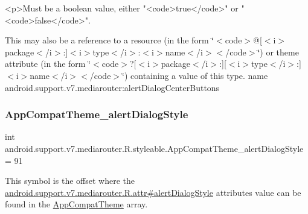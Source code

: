 \begin{DoxyVerb}      <p>Must be a boolean value, either "<code>true</code>" or "<code>false</code>".
\end{DoxyVerb}
 

This may also be a reference to a resource (in the form \char`\"{}$<$code$>$@\mbox{[}$<$i$>$package$<$/i$>$\+:\mbox{]}$<$i$>$type$<$/i$>$\+:$<$i$>$name$<$/i$>$$<$/code$>$\char`\"{}) or theme attribute (in the form \char`\"{}$<$code$>$?\mbox{[}$<$i$>$package$<$/i$>$\+:\mbox{]}\mbox{[}$<$i$>$type$<$/i$>$\+:\mbox{]}$<$i$>$name$<$/i$>$$<$/code$>$\char`\"{}) containing a value of this type.  name android.\+support.\+v7.\+mediarouter\+:alert\+Dialog\+Center\+Buttons \mbox{\label{classandroid_1_1support_1_1v7_1_1mediarouter_1_1R_1_1styleable_aa0353bad7ae900c7e85a37565a5fb265}} 
\subsubsection{\texorpdfstring{App\+Compat\+Theme\+\_\+alert\+Dialog\+Style}{AppCompatTheme\_alertDialogStyle}}
{\footnotesize\ttfamily int android.\+support.\+v7.\+mediarouter.\+R.\+styleable.\+App\+Compat\+Theme\+\_\+alert\+Dialog\+Style = 91\hspace{0.3cm}{\ttfamily [static]}}

This symbol is the offset where the \hyperlink{classandroid_1_1support_1_1v7_1_1mediarouter_1_1R_1_1attr_af17b398dd801c0d70f81ba58e0201871}{android.\+support.\+v7.\+mediarouter.\+R.\+attr\#alert\+Dialog\+Style} attribute\textquotesingle{}s value can be found in the \hyperlink{classandroid_1_1support_1_1v7_1_1mediarouter_1_1R_1_1styleable_a4e3d3900c75d49aeb2f283cac00214d6}{App\+Compat\+Theme} array.

